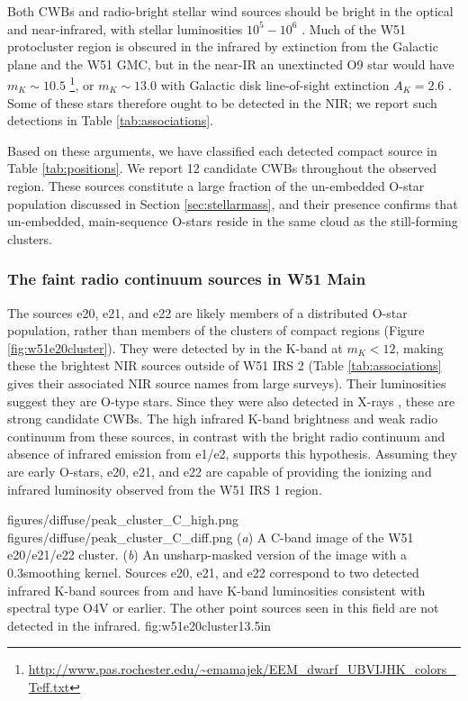 Both CWBs and radio-bright stellar wind sources should be bright in the
optical and near-infrared, with stellar luminosities $10^5-10^6$ \lsun.
Much of the W51 protocluster region is obscured in the infrared by extinction
from the Galactic plane and the W51 GMC, but in the near-IR an unextincted O9
star would have
$m_K\sim10.5$
\citep{Pecaut2013a}\footnote{\url{http://www.pas.rochester.edu/~emamajek/EEM_dwarf_UBVIJHK_colors_Teff.txt}},
or $m_K\sim 13.0$ with Galactic disk line-of-sight extinction $A_K=2.6$
\citep{Goldader1994a}.  Some of these stars therefore ought to be detected in
the NIR; we report such detections in Table \ref{tab:associations}.

Based on these arguments, we have classified each detected compact source in
Table \ref{tab:positions}.  We report 12 candidate CWBs throughout the observed
region.  These sources constitute a large fraction of the un-embedded O-star
population discussed in Section \ref{sec:stellarmass}, and their presence confirms
that un-embedded, main-sequence O-stars reside in the same cloud as the still-forming
clusters.

\subsubsection{The faint radio continuum sources in W51 Main}
\label{sec:faintw51main}

The sources e20, e21, and e22 are likely members of a distributed O-star
population, rather than members of the clusters of compact \hii regions (Figure
\ref{fig:w51e20cluster}).  They were detected by \citet{Goldader1994a} in the
K-band at $m_K < 12$, making these the brightest NIR sources outside of W51
IRS 2 (Table \ref{tab:associations} gives their associated NIR source names
from large surveys).  Their luminosities suggest they are O-type stars.  Since
they were also detected in X-rays \citep{Townsley2014a}, these are strong
candidate CWBs.  The high infrared K-band brightness and weak radio
continuum from these sources, in contrast with the bright radio continuum and
absence of infrared emission from e1/e2, supports this hypothesis.  
Assuming they are early O-stars, e20, e21, and e22 are capable of providing the
ionizing and infrared luminosity observed from the W51 IRS 1 \hii region.

\FigureTwo
{figures/diffuse/peak_cluster_C_high.png}
{figures/diffuse/peak_cluster_C_diff.png}
{({\it a}) A C-band image of the W51 e20/e21/e22 cluster.
({\it b}) An unsharp-masked version of the image with a 0.3\arcsec smoothing
kernel. 
Sources e20, e21, and e22 correspond to two detected infrared K-band sources from
\citet[][Table \ref{tab:associations}]{Goldader1994a} and have K-band
luminosities consistent with spectral type O4V or earlier.  The other point
sources seen in this field are not detected in the infrared.
}
{fig:w51e20cluster}{1}{3.5in}



